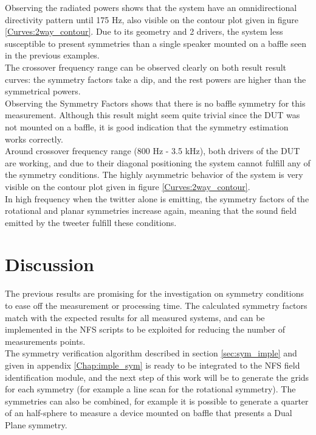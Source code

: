 \documentclass{report}
\begin{document}
\vspace{0.4cm}

Observing the radiated powers shows that the system have an omnidirectional directivity pattern until 175 Hz, also visible on the contour plot given in figure \ref{Curves:2way_contour}. Due to its geometry and 2 drivers, the system less susceptible to present symmetries than a single speaker mounted on a baffle seen in the previous examples.\\
The crossover frequency range can be observed clearly on both result result curves: the symmetry factors take a dip, and the rest powers are higher than the symmetrical powers. \\

Observing the Symmetry Factors shows that there is no baffle symmetry for this measurement. Although this result might seem quite trivial since the DUT was not mounted on a baffle, it is good indication that the symmetry estimation works correctly. \\
Around crossover frequency range (800 Hz - 3.5 kHz), both drivers of the DUT are working, and due to their diagonal positioning the system cannot fulfill any of the symmetry conditions. The highly asymmetric behavior of the system is very visible on the contour plot given in figure \ref{Curves:2way_contour}. \\
In high frequency when the twitter alone is emitting, the symmetry factors of the rotational and planar symmetries increase again, meaning that the sound field emitted by the tweeter fulfill these conditions. 

\section{Discussion}

The previous results are promising for the investigation on symmetry conditions to ease off the measurement or processing time. The calculated symmetry factors match with the expected results for all measured systems, and can be implemented in the NFS scripts to be exploited for reducing the number of measurements points. \\

The symmetry verification algorithm described in section \ref{sec:sym_imple} and given in appendix \ref{Chap:imple_sym} is ready to be integrated to the NFS field identification module, and the next step of this work will be to generate the grids for each symmetry (for example a line scan for the rotational symmetry). The symmetries can also be combined, for example it is possible to generate a quarter of an half-sphere to measure a device mounted on baffle that presents a Dual Plane symmetry. 
\end{document}
